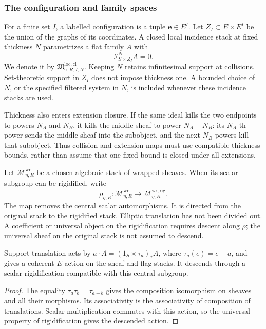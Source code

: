 \subsubsection*{The configuration and family spaces}

For a finite set $I$, a labelled configuration is a tuple
$\mathbf e\in E^I$. Let $Z_I\subset E\times E^I$ be the union of
the graphs of its coordinates. A closed local incidence stack at
fixed thickness $N$ parametrizes a flat family $A$ with
\[
 \mathcal I_{S\times Z_I}^{N}A=0.
\]
We denote it by $\mathfrak M^{\mathrm{loc,cl}}_{\gamma,R,I,N}$.
Keeping $N$ retains infinitesimal support at collisions. Set-theoretic
support in $Z_I$ does not impose thickness one. A bounded choice of
$N$, or the specified filtered system in $N$, is included whenever
these incidence stacks are used.

Thickness also enters extension closure. If the same ideal kills
the two endpoints to powers $N_A$ and $N_B$, it kills the middle
sheaf to power $N_A+N_B$: its $N_A$-th power sends the middle
sheaf into the subobject, and the next $N_B$ powers kill that
subobject. Thus collision and extension maps must use compatible
thickness bounds, rather than assume that one fixed bound is
closed under all extensions.

\begin{definition}
\label{def:e-equivariant-wrapped-prequotient-stack}
Let $\mathcal M^{\mathrm{wr}}_{\eta,R}$ be a chosen algebraic
stack of wrapped sheaves. When its scalar subgroup can be
rigidified, write
\[
 \rho_{\eta,R}:\mathcal M^{\mathrm{wr}}_{\eta,R}
 \longrightarrow\mathcal M^{\mathrm{wr,rig}}_{\eta,R}.
\]
The map removes the central scalar automorphisms. It is directed
from the original stack to the rigidified stack. Elliptic
translation has not been divided out. A coefficient or universal
object on the rigidification requires descent along $\rho$;
the universal sheaf on the original stack is not assumed to descend.
\end{definition}

\begin{lemma}
\label{lem:e-action-law-wrapped-prequotient}
Support translation acts by
$a\cdot A=(1_S\times\tau_a)_*A$, where $\tau_a(e)=e+a$,
and gives a coherent $E$-action
on the sheaf and flag stacks. It descends through a scalar
rigidification compatible with this central subgroup.
\end{lemma}

\begin{proof}
The equality $\tau_a\tau_b=\tau_{a+b}$ gives the composition
isomorphism on sheaves and all their morphisms. Its associativity
is the associativity of composition of translations. Scalar
multiplication commutes with this action, so the universal property
of rigidification gives the descended action.
\end{proof}

